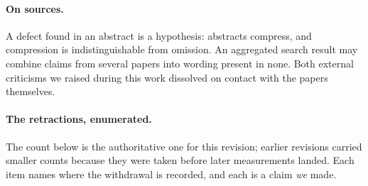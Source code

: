 \documentclass[11pt]{article}
\theoremstyle{definition}
\begin{document}
\paragraph{On sources.} A defect found in an abstract is a hypothesis: abstracts
compress, and compression is indistinguishable from omission. An aggregated
search result may combine claims from several papers into wording present in
none. Both external criticisms we raised during this work dissolved on contact
with the papers themselves.

\paragraph{The retractions, enumerated.} The count below is the authoritative one
for this revision; earlier revisions carried smaller counts because they were
taken before later measurements landed. Each item names where the withdrawal is
recorded, and each is a claim \emph{we} made.
\end{document}

